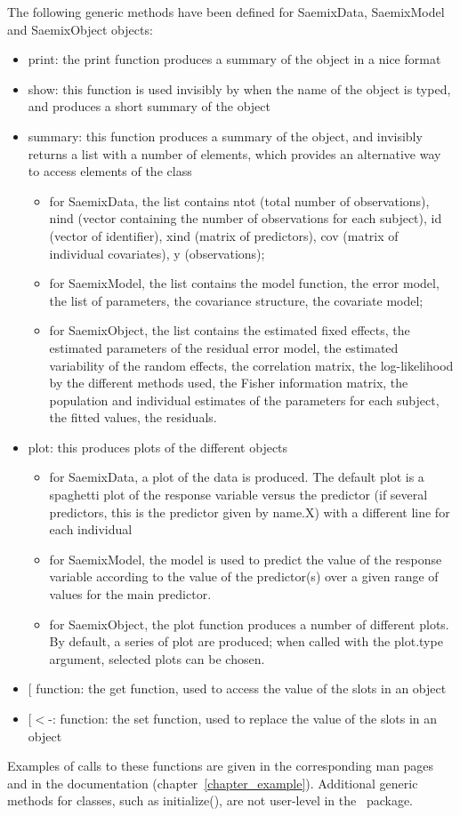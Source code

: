 The following generic methods have been defined for {\sf SaemixData}, {\sf SaemixModel} and {\sf SaemixObject} objects:
\begin{itemize}
\item print: the print function produces a summary of the object in a nice format
\item show: this function is used invisibly by \R when the name of the object is typed, and produces a short summary of the object
\item summary: this function produces a summary of the object, and invisibly returns a list with a number of elements, which provides an alternative way to access elements of the class
   \begin{itemize}
   \item for {\sf SaemixData}, the list contains ntot (total number of observations), nind (vector containing the number of observations for each subject), id (vector of identifier), xind (matrix of predictors), cov (matrix of individual covariates), y (observations);
   \item for {\sf SaemixModel}, the list contains the model function, the error model, the list of parameters, the covariance structure, the covariate model;
   \item for {\sf SaemixObject}, the list contains the estimated fixed effects, the estimated parameters of the residual error model, the estimated variability of the random effects, the correlation matrix, the log-likelihood by the different methods used, the Fisher information matrix, the population and individual estimates of the parameters for each subject, the fitted values, the residuals.
   \end{itemize}
\item plot: this produces plots of the different objects
   \begin{itemize}
   \item for {\sf SaemixData}, a plot of the data is produced. The default plot is a spaghetti plot of the response variable versus the predictor (if several predictors, this is the predictor given by name.X) with a different line for each individual
   \item for {\sf SaemixModel}, the model is used to predict the value of the response variable according to the value of the predictor(s) over a given range of values for the main predictor.
   \item for {\sf SaemixObject}, the plot function produces a number of different plots. By default, a series of plot are produced; when called with the {\sf plot.type} argument, selected plots can be chosen.
   \end{itemize}
\item $[$ function: the get function, used to access the value of the slots in an object
\item $[<$-: function: the set function, used to replace the value of the slots in an object
\end{itemize}
Examples of calls to these functions are given in the corresponding man pages and in the documentation (chapter~\ref{chapter_example}). Additional generic methods for classes, such as {\sf initialize()}, are not user-level in the \monolix~package.

